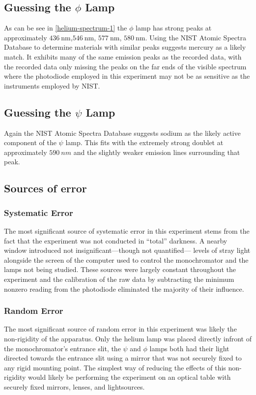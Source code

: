 \documentclass[10pt, twocolumn]{article}
\theoremstyle{definition}
\begin{document}
\subsection{Guessing the $\phi$ Lamp}
As can be see in \ref{helium-spectrum-1} the $\phi$ lamp has strong peaks at approximately
$\qty{436}{\nano\meter}$,$\qty{546}{\nano\meter}$, $\qty{577}{\nano\meter}$, $\qty{580}{\nano\meter}$. Using the
NIST Atomic Spectra Database\autocite{spectrum-db} to determine materials with similar peaks suggests mercury as a likely
match. It exhibits many of the same emission peaks as the recorded data,
with the recorded data only missing the peaks on the far ends of the visible spectrum where the photodiode employed in
this experiment may not be as sensitive as the instruments employed by NIST.
\subsection{Guessing the $\psi$ Lamp}
Again the NIST Atomic Spectra Database\autocite{spectrum-db} suggests sodium as the likely active component of the $\psi$ lamp.
This fits with the extremely strong doublet at approximately $\qty{590}{nm}$ and the slightly weaker emission lines surrounding that
peak.
\subsection{Sources of error}
\subsubsection{Systematic Error}
The most significant source of systematic error in this experiment stems from the fact that the experiment
was not conducted in ``total'' darkness. A nearby window introduced not insignificant---though not quantified---
levels of stray light alongside the screen of the computer used to control the monochromator and the lamps not
being studied. These sources were largely constant throughout the experiment and the calibration of the raw data by
subtracting the minimum nonzero reading from the photodiode eliminated the majority of their
influence.
\subsubsection{Random Error}
The most significant source of random error in this experiment was likely the non-rigidity of the apparatus. Only the helium
lamp was placed directly infront of the monochromator's entrance slit, the $\psi$ and $\phi$ lamps both had their light directed
towards the entrance slit using a mirror that was not securely fixed to any rigid mounting point. The simplest way of
reducing the effects of this non-rigidity would likely be performing the experiment on an optical table with securely fixed
mirrors, lenses, and lightsources.
\end{document}
